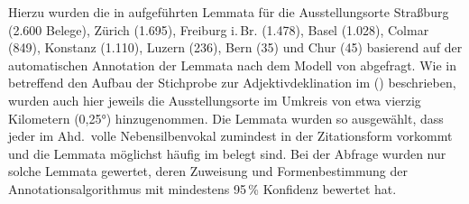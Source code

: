 Hierzu wurden die in  aufgeführten Lemmata für die
Ausstellungsorte
Straßburg (2.600 Belege),
% 
Zürich (1.695),
% 
Freiburg i.\,Br. (1.478),
% 
Basel (1.028),
% 
Colmar (849),
% 
Konstanz (1.110),
% 
Luzern (236),
% 
Bern (35)
% 
und Chur (45)
% 
basierend auf der automatischen Annotation der Lemmata nach dem Modell von
\citet{schmid2019} abgefragt. Wie in  betreffend den
Aufbau der Stichprobe zur Adjektivdeklination im  (\CAO) beschrieben, wurden auch hier jeweils die
Ausstellungsorte im Umkreis von etwa vierzig Kilometern (0,25°) hinzugenommen.
Die Lemmata wurden so ausgewählt, dass jeder im Ahd.\ volle Nebensilbenvokal
zumindest in der Zitationsform vorkommt und die Lemmata möglichst häufig im
\CAO{} belegt sind. Bei der Abfrage wurden nur solche Lemmata gewertet, deren
Zuweisung und Formenbestimmung der Annotations\-algorithmus mit mindestens
95\,\% Konfidenz bewertet hat.


